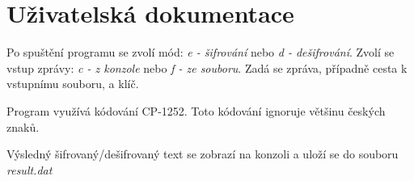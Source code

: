 \setlength{\parskip}{1em}

\chapter{Uživatelská dokumentace}

Po spuštění programu se zvolí mód: \emph{e - šifrování} nebo \emph{d - dešifrování}. Zvolí se vstup zprávy: \emph{c - z konzole} nebo \emph{f - ze souboru}. Zadá se zpráva, případně cesta k vstupnímu souboru, a klíč.

Program využívá kódování CP-1252. Toto kódování ignoruje většinu českých znaků.

Výsledný šifrovaný/dešifrovaný text se zobrazí na konzoli a uloží se do souboru \emph{result.dat}